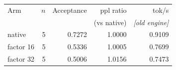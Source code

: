 \begin{tabular}{lrrrr}
\toprule
Arm & $n$ & Acceptance & ppl ratio & tok/s \\
 & & & (vs native) & \emph{[old engine]} \\
\midrule
native & 5 & 0.7272 & 1.0000 & 0.9109 \\
factor 16 & 5 & 0.5336 & 1.0005 & 0.7699 \\
factor 32 & 5 & 0.5006 & 1.0156 & 0.7473 \\
\bottomrule
\end{tabular}
